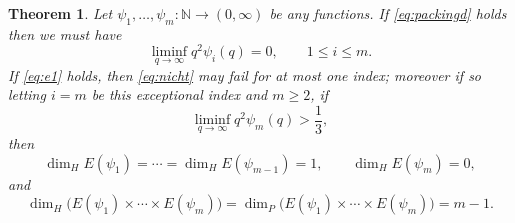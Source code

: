 \documentclass[11pt]{amsart}
\numberwithin{equation}{section}
\newcommand{\N}{{\Bbb N}}
\newcommand{\0}{\mathbf{0}}
\newtheorem{theorem}{Theorem}[section]
\theoremstyle{remark}
\def\N{\mathbb N}
\def\N{\mathbb N}
\def\N{\mathbb N}
\newcommand{\dimH}{\dim_{H}}
\begin{document}
\begin{theorem}  \label{T2}
    Let $\psi_1,\ldots,\psi_m:\N\to(0,\infty)$ be any functions.
    If \eqref{eq:packingd} holds then we must have
\begin{equation} \label{eq:nicht}
    \liminf_{q\to\infty} q^2 \psi_i(q) = 0, \qquad 1\le i\le m.
\end{equation}
 If \eqref{eq:e1} holds, then \eqref{eq:nicht} may fail for at most one index; moreover if so letting $i=m$ be this exceptional index
 and $m\ge 2$, if
 \begin{equation} \label{eq:kannsein}
     \liminf_{q\to\infty} q^2 \psi_m(q) > \frac{1}{3},
 \end{equation}
 then
 \begin{equation} \label{eq:haelt}
\dim_H E(\psi_1)= \cdots=\dim_H E(\psi_{m-1})=1,\qquad \dim_H E(\psi_m)=0, 
\end{equation}
and
\[
\dimH\bigl(E(\psi_1)\times\cdots\times E(\psi_m)\bigr)
=\dim_P\bigl(E(\psi_1)\times\cdots\times E(\psi_m)\bigr)
=
m-1.
\]
\end{theorem}
\end{document}
